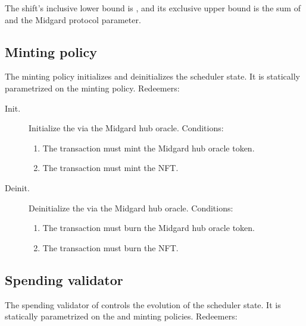 \documentclass[../midgard.tex]{subfiles}
\begin{document}
The shift's inclusive lower bound is , and its exclusive upper bound is the sum of  and the  Midgard protocol parameter.

\subsection{Minting policy}
\label{h:scheduler-minting-policy}

The  minting policy initializes and deinitializes the scheduler state. It is statically parametrized on the  minting policy. Redeemers:

\begin{description}
    \item[Init.] Initialize the  via the Midgard hub oracle. Conditions:
        \begin{enumerate}
            \item The transaction must mint the Midgard hub oracle token.
            \item The transaction must mint the  NFT.
        \end{enumerate}

    \item[Deinit.] Deinitialize the  via the Midgard hub oracle. Conditions:
        \begin{enumerate}
            \item The transaction must burn the Midgard hub oracle token.
            \item The transaction must burn the  NFT.
        \end{enumerate}
\end{description}

\subsection{Spending validator}
\label{h:scheduler-spending-validator}

The spending validator of  controls the evolution of the scheduler state. It is statically parametrized on the  and  minting policies. Redeemers:
\end{document}
